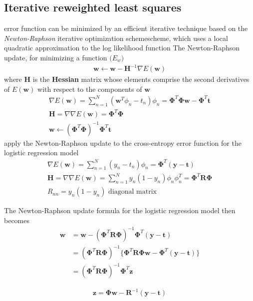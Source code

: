 \documentclass[a4paper]{article}
\begin{document}
\subsection{Iterative reweighted least squares}
error function can be minimized by an efficient iterative technique based on the
 \textit{Newton-Raphson} iterative optimization schemescheme, which uses a
 local quadratic approximation to the log likelihood function
The Newton-Raphson update, for minimizing a function $\mathit(E_w)$
\begin{align}
\mathbf{w} \gets \mathbf{w} - \mathbf{H}^{-1} \nabla \mathit{E}(\mathbf{w})
\end{align}
where $\mathbf{H}$ is the \textbf{Hessian} matrix whose elements comprise the second derivatives of $\mathit{E}(\mathbf{w})$ with respect to the components of $\mathbf{w}$
\begin{align}
\nabla \mathit{E}(\mathbf{w}) = \displaystyle \sum_{n=1}^N
  (\mathbf{w}^T \phi_n - t_n ) \phi_n = \mathbf{\Phi}^T \mathbf{\Phi}
  \mathbf{w} - \mathbf{\Phi}^T \mathbf{t}
\\
\mathbf{H} = \nabla \nabla E(\mathbf{w}) = \mathbf{\Phi}^T \mathbf{\Phi}
\\
\mathbf{w} \gets (\mathbf{\Phi}^T \mathbf{\Phi})^{-1}\mathbf{\Phi}^T \mathbf{t}
\end{align}
apply the Newton-Raphson update to the cross-entropy error function
 for the logistic regression model
\begin{align}
\nabla \mathit{E}(\mathbf{w}) = \displaystyle \sum_{n=1}^N
  (y_n - t_n ) \phi_n = \mathbf{\Phi}^T (\mathbf{y} - \mathbf{t})
\\
\mathbf{H} = \nabla \nabla E(\mathbf{w}) = \displaystyle
  \sum_{n=1}^N y_n(1-y_n)\phi_n\phi_n^T = \mathbf{\Phi}^T
  \mathbf{R} \mathbf{\Phi}
\\
R_{nn} = y_n(1-y_n) \text{ diagonal matrix }
\end{align}

The Newton-Raphson update formula for the logistic regression model then becomes
\begin{align*}
\mathbf{w} &= \mathbf{w} - (\mathbf{\Phi}^T \mathbf{R}
             \mathbf{\Phi})^{-1}\mathbf{\Phi}^T (\mathbf{y} -
             \mathbf{t})
\\
&= (\mathbf{\Phi}^T \mathbf{R} \mathbf{\Phi})^{-1} \{\mathbf{\Phi}^T
  \mathbf{R} \mathbf{\Phi} \mathbf{w} -
  \mathbf{\Phi}^T (\mathbf{y} - \mathbf{t}) \}
\\
&=(\mathbf{\Phi}^T \mathbf{R} \mathbf{\Phi})^{-1} \mathbf{\Phi}^T \mathbf{z}
\end{align*}

\begin{align}
\mathbf{z} = \mathbf{\Phi} \mathbf{w} - \mathbf{R}^{-1}(\mathbf{y} - \mathbf{t})
\end{align}
\end{document}

